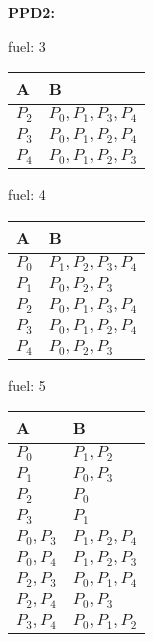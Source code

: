     \newpage
    \textbf{PPD2: }\\
    
    \begin{minipage}[t]{0.30\textwidth}
        fuel: 3\\
    \begin{tabular}{l|l}
        A & B \\\hline
        $P_2$ & $P_0, P_1, P_3, P_4$ \\
        $P_3$ & $P_0, P_1, P_2, P_4$ \\
        $P_4$ & $P_0, P_1, P_2, P_3$ \\
    \end{tabular}
    \end{minipage}
    \hfill
    \begin{minipage}[t]{0.30\textwidth}
        fuel: 4\\
    \begin{tabular}{l|l}
        A & B \\\hline
        $P_0$ & $P_1, P_2, P_3, P_4$ \\
        $P_1$ & $P_0, P_2, P_3$ \\
        $P_2$ & $P_0, P_1, P_3, P_4$ \\
        $P_3$ & $P_0, P_1, P_2, P_4$ \\
        $P_4$ & $P_0, P_2, P_3$ \\
    \end{tabular}
    \end{minipage}
    \hfill
    \begin{minipage}[t]{0.30\textwidth}
        fuel: 5\\
    \begin{tabular}{l|l}
        A & B \\\hline
        $P_0$ & $P_1, P_2$ \\
        $P_1$ & $P_0, P_3$ \\
        $P_2$ & $P_0$ \\
        $P_3$ & $P_1$ \\
        $P_0, P_3$ & $P_1, P_2, P_4$ \\
        $P_0, P_4$ & $P_1, P_2, P_3$ \\
        $P_2, P_3$ & $P_0, P_1, P_4$ \\
        $P_2, P_4$ & $P_0, P_3$ \\
        $P_3, P_4$ & $P_0, P_1, P_2$ \\	
    \end{tabular}
    \end{minipage}
    
